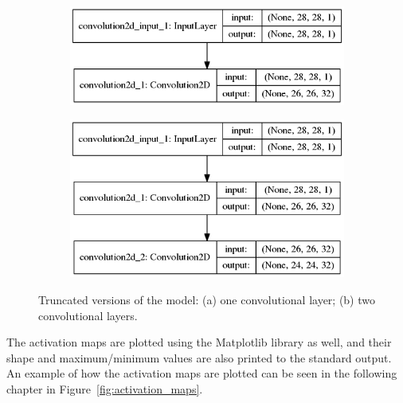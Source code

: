 \begin{figure}
	\begin{subfigure}{0.5\textwidth}
		\centering
		\includegraphics[width=0.9\linewidth]{figures/1stconvarch.png}
		\caption{}
	\end{subfigure}
	\begin{subfigure}{0.5\textwidth}
		\centering
		\includegraphics[width=0.9\linewidth]{figures/2ndconvarch.png}
		\caption{}
	\end{subfigure}
	\caption{Truncated versions of the model: (a) one convolutional layer; (b) two convolutional layers.}
	\label{fig:truncated}
\end{figure}

The activation maps are plotted using the Matplotlib library as well, and their shape and maximum/minimum values are also printed to the standard output. An example of how the activation maps are plotted can be seen in the following chapter in Figure~\ref{fig:activation_maps}.
